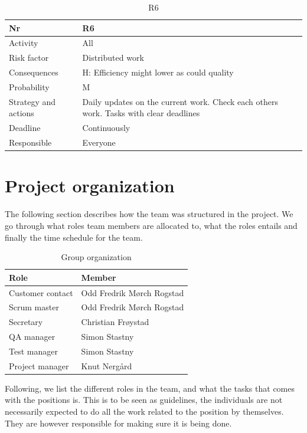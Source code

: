 \documentclass[11pt]{book}
\begin{document}
\begin{table}[H]
\centering
\begin{tabular}{ l  p{11cm} }
	Nr						& R6 																		\\ \hline
	Activity				& All 																		\\ \hline
	Risk factor				& Distributed work 															\\ \hline
	Consequences			& H: Efficiency might lower as could quality 								\\ \hline
	Probability				& M 																		\\ \hline
	Strategy and actions	& Daily updates on the current work. Check each others work. Tasks with 
								clear deadlines 														\\ \hline
	Deadline				& Continuously 																\\ \hline
	Responsible				& Everyone 																	\\ 
\end{tabular}
\label{tab:risk_6}
\caption{R6}
\end{table}

\section{Project organization}
The following section describes how the team was structured in the project. We go through what roles team members are allocated to, what the roles entails and finally the time schedule for the team.

\begin{table}[H]
\centering
	\begin{tabular}{ l  p{11cm}  } 	Role 				& Member 					\\ \hline
	Customer contact	& Odd Fredrik Mørch Rogstad \\ \hline
	Scrum master		& Odd Fredrik Mørch Rogstad \\ \hline
	Secretary			& Christian Frøystad 		\\ \hline
	QA manager			& Simon Stastny 			\\ \hline
	Test manager		& Simon Stastny 			\\ \hline
	Project manager		& Knut Nergård 				\\
\end{tabular}
\label{tab:org}
\caption{Group organization}
\end{table}

Following, we list the different roles in the team, and what the tasks that comes with the positions is. This is to be seen as guidelines, the individuals are not necessarily expected to do all the work related to the position by themselves. They are however responsible for making sure it is being done.
\end{document}
